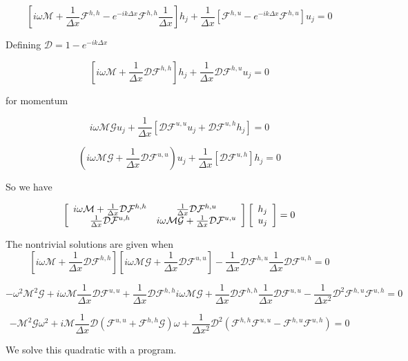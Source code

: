 \documentclass[12pt]{article}
\begin{document}
\[\left[i\omega\mathcal{M} + \frac{1}{\Delta x}\mathcal{F}^{h,h}   - e^{-ik\Delta x}\mathcal{F}^{h,h}  \frac{1}{\Delta x} \right]h_j + \frac{1}{\Delta x}\left[\mathcal{F}^{h,u}  - e^{-ik\Delta x}\mathcal{F}^{h,u}\right] u_{j} = 0 \]

Defining $\mathcal{D} = 1 -e^{-ik\Delta x}$

\[\left[i\omega\mathcal{M} + \frac{1}{\Delta x} \mathcal{D} \mathcal{F}^{h,h} \right]h_j + \frac{1}{\Delta x}\mathcal{D}\mathcal{F}^{h,u} u_{j} = 0 \]

for momentum

\[i\omega \mathcal{M} \mathcal{G}u_j + \frac{1}{\Delta x}\left[\mathcal{D}\mathcal{F}^{u,u}u_{j}  + \mathcal{D}\mathcal{F}^{u,h} h_{j}\right] = 0 \]

\[\left(i\omega \mathcal{M} \mathcal{G} + \frac{1}{\Delta x}\mathcal{D}\mathcal{F}^{u,u}\right)u_j + \frac{1}{\Delta x}\left[ \mathcal{D}\mathcal{F}^{u,h}\right]h_{j} = 0 \]

So we have

\[ \left[\begin{array}{c c}
i\omega\mathcal{M} + \frac{1}{\Delta x} \mathcal{D}\mathcal{F}^{h,h}  & \frac{1}{\Delta x} \mathcal{D}\mathcal{F}^{h,u}\\
\frac{1}{\Delta x} \mathcal{D}\mathcal{F}^{u,h} &
i\omega \mathcal{M} \mathcal{G} + \frac{1}{\Delta x}\mathcal{D}\mathcal{F}^{u,u}
\end{array} \right] 
\left[\begin{array}{c}
h_j \\
u_j
\end{array} \right] = 0\]

The nontrivial solutions are given when 
\[\left[i\omega\mathcal{M} + \frac{1}{\Delta x} \mathcal{D}\mathcal{F}^{h,h} \right]\left[i\omega \mathcal{M} \mathcal{G} + \frac{1}{\Delta x}\mathcal{D}\mathcal{F}^{u,u}\right] -\frac{1}{\Delta x} \mathcal{D}\mathcal{F}^{h,u}\frac{1}{\Delta x} \mathcal{D}\mathcal{F}^{u,h} = 0  \]

\[-\omega^2 \mathcal{M}^2 \mathcal{G} + i\omega\mathcal{M}\frac{1}{\Delta x}\mathcal{D}\mathcal{F}^{u,u} + \frac{1}{\Delta x} \mathcal{D}\mathcal{F}^{h,h}i\omega \mathcal{M} \mathcal{G} + \frac{1}{\Delta x} \mathcal{D}\mathcal{F}^{h,h}\frac{1}{\Delta x}\mathcal{D}\mathcal{F}^{u,u}  -\frac{1}{\Delta x^2} \mathcal{D}^2\mathcal{F}^{h,u}\mathcal{F}^{u,h} = 0  \]

\[-\mathcal{M}^2 \mathcal{G} \omega^2 + i\mathcal{M}\frac{1}{\Delta x}\mathcal{D}\left( \mathcal{F}^{u,u} + \mathcal{F}^{h,h} \mathcal{G} \right) \omega + \frac{1}{\Delta x^2} \mathcal{D}^2 \left(\mathcal{F}^{h,h}\mathcal{F}^{u,u}  -\mathcal{F}^{h,u}\mathcal{F}^{u,h} \right) = 0  \]

We solve this quadratic with a program. 
\end{document}

